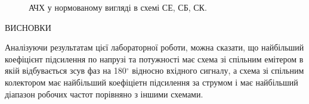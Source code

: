 \documentclass[a4paper,14pt]{extreport}
\begin{document}
\begin{figure}[h]
\label{ris5}
\caption{АЧХ у нормованому вигляді в схемі СЕ, СБ, СК.}
\end{figure}

\clearpage
\newpage

\begin{center}ВИСНОВКИ\end{center}
Аналізуючи результатам цієї лабораторної роботи, можна сказати, що найбільший коефіцієнт підсилення по напрузі та потужності має схема зі спільним емітером в якій відбувається зсув фаз на 180$^\circ$ відносно вхідного сигналу, а схема зі спільним колектором має найбільший коефіціетн підсилення за струмом і має найбільший діапазон робочих частот порівняно з іншими схемами.
\end{document}
